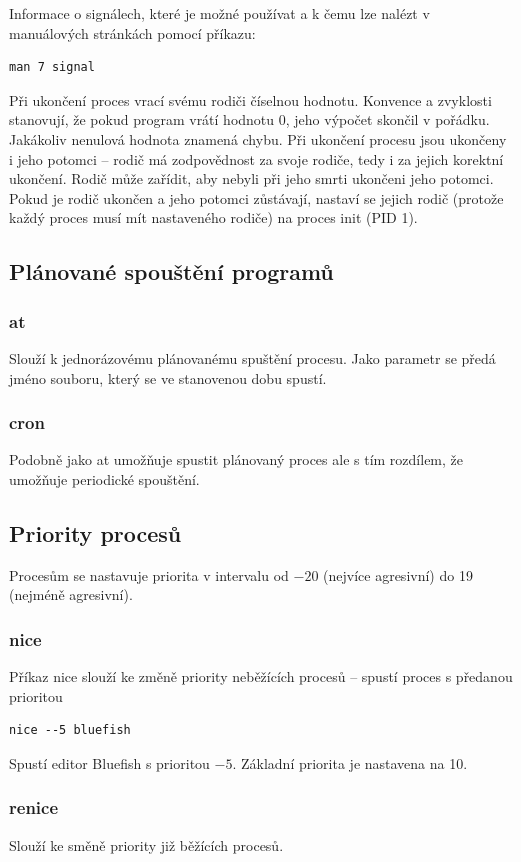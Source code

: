 \documentclass{article}
\begin{document}
Informace o signálech, které je možné používat a k čemu lze nalézt v manuálových stránkách pomocí příkazu:
\begin{verbatim}
man 7 signal
\end{verbatim}

Při ukončení proces vrací svému rodiči číselnou hodnotu. Konvence a zvyklosti stanovují, že pokud program vrátí hodnotu 0, jeho výpočet skončil v pořádku. Jakákoliv nenulová hodnota znamená chybu. Při ukončení procesu jsou ukončeny i jeho potomci -- rodič má zodpovědnost za svoje rodiče, tedy i za jejich korektní ukončení. Rodič může zařídit, aby nebyli při jeho smrti ukončeni jeho potomci. Pokud je rodič ukončen a jeho potomci zůstávají, nastaví se jejich rodič (protože každý proces musí mít nastaveného rodiče) na proces init (PID 1).

\subsection{Plánované spouštění programů}
\subsubsection{at}
Slouží k jednorázovému plánovanému spuštění procesu. Jako parametr se předá jméno souboru, který se ve stanovenou dobu spustí. 

\subsubsection{cron}
Podobně jako at umožňuje spustit plánovaný proces ale s tím rozdílem, že umožňuje periodické spouštění. 

\subsection{Priority procesů}
Procesům se nastavuje priorita v intervalu od $-20$ (nejvíce agresivní) do 19 (nejméně agresivní).
\subsubsection{nice}
Příkaz nice slouží ke změně priority neběžících procesů -- spustí proces s předanou prioritou
\begin{verbatim}
nice --5 bluefish
\end{verbatim}
Spustí editor Bluefish s prioritou $-5$. Základní priorita je nastavena na 10.

\subsubsection{renice}
Slouží ke směně priority již běžících procesů.
\end{document}
